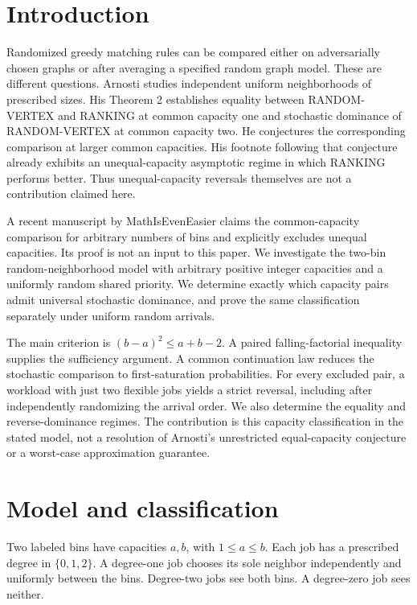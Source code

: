 \section{Introduction}\label{introduction}

Randomized greedy matching rules can be compared either on adversarially chosen graphs or after averaging a specified random graph model. These are different questions. Arnosti \cite{Arnosti2022} studies independent uniform neighborhoods of prescribed sizes. His Theorem 2 establishes equality between RANDOM-VERTEX and RANKING at common capacity one and stochastic dominance of RANDOM-VERTEX at common capacity two. He conjectures the corresponding comparison at larger common capacities. His footnote following that conjecture already exhibits an unequal-capacity asymptotic regime in which RANKING performs better. Thus unequal-capacity reversals themselves are not a contribution claimed here.

A recent manuscript by MathIsEvenEasier \cite{MathIsEvenEasier2026} claims the common-capacity comparison for arbitrary numbers of bins and explicitly excludes unequal capacities. Its proof is not an input to this paper. We investigate the two-bin random-neighborhood model with arbitrary positive integer capacities and a uniformly random shared priority. We determine exactly which capacity pairs admit universal stochastic dominance, and prove the same classification separately under uniform random arrivals.

The main criterion is \((b-a)^2\le a+b-2\). A paired falling-factorial inequality supplies the sufficiency argument. A common continuation law reduces the stochastic comparison to first-saturation probabilities. For every excluded pair, a workload with just two flexible jobs yields a strict reversal, including after independently randomizing the arrival order. We also determine the equality and reverse-dominance regimes. The contribution is this capacity classification in the stated model, not a resolution of Arnosti's unrestricted equal-capacity conjecture or a worst-case approximation guarantee.

\section{Model and classification}\label{model-and-classification}

Two labeled bins have capacities \(a,b\), with \(1 \le  a \le  b\). Each job has a prescribed degree in \(\{0,1,2\}\). A degree-one job chooses its sole neighbor independently and uniformly between the bins. Degree-two jobs see both bins. A degree-zero job sees neither.

